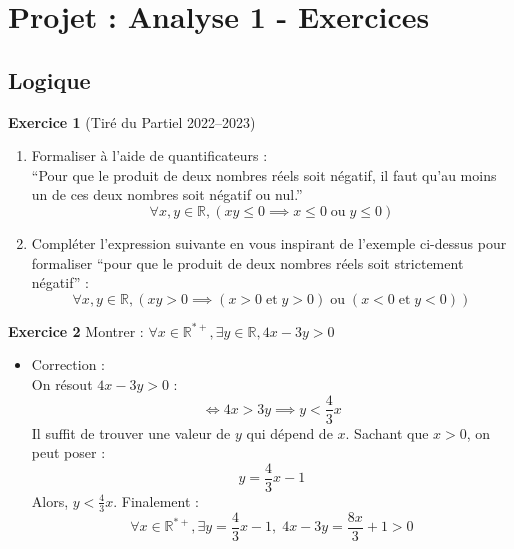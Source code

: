 \documentclass[a4paper, 12pt]{article}
\begin{document}
\section*{Projet : Analyse 1 - Exercices}

\subsection*{Logique}

\textbf{Exercice 1} (Tiré du Partiel 2022--2023)
\begin{enumerate}
    \item Formaliser à l'aide de quantificateurs : \\
    ``Pour que le produit de deux nombres réels soit négatif, il faut qu'au moins un de ces deux nombres soit négatif ou nul.'' \\
    \[
    \forall x, y \in \mathbb{R}, (xy \leq 0 \implies x \leq 0 \; \text{ou} \; y \leq 0)
    \]

    \item Compléter l'expression suivante en vous inspirant de l'exemple ci-dessus pour formaliser ``pour que le produit de deux nombres réels soit strictement négatif'' :
    \[
    \forall x, y \in \mathbb{R}, (xy > 0 \implies (x > 0 \; \text{et} \; y > 0) \; \text{ou} \; (x < 0 \; \text{et} \; y < 0))
    \]
\end{enumerate}

\textbf{Exercice 2} Montrer : \(\forall x \in \mathbb{R}^{*+}, \exists y \in \mathbb{R}, 4x - 3y > 0\)
\begin{itemize}
    \item Correction : \\
    On résout \(4x - 3y > 0\) :
    \[
    \iff 4x > 3y \implies y < \frac{4}{3}x
    \]
    Il suffit de trouver une valeur de \(y\) qui dépend de \(x\). Sachant que \(x > 0\), on peut poser :
    \[
    y = \frac{4}{3}x - 1
    \]
    Alors, \(y < \frac{4}{3}x\). Finalement :
    \[
    \forall x \in \mathbb{R}^{*+}, \exists y = \frac{4}{3}x - 1, \; 4x - 3y = \frac{8x}{3} + 1 > 0
    \]
\end{itemize}
\end{document}
